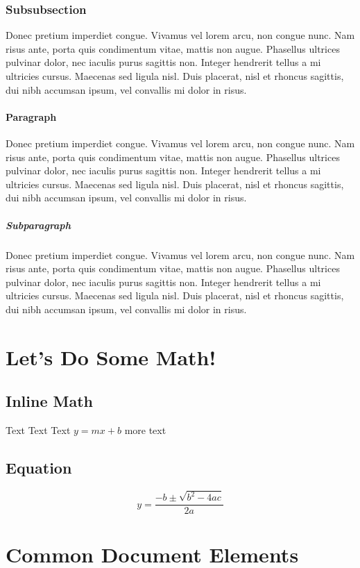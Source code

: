\documentclass{article}
\begin{document}
\subsubsection{Subsubsection}
Donec pretium imperdiet congue. Vivamus vel lorem arcu, non congue nunc. Nam
risus ante, porta quis condimentum vitae, mattis non augue. Phasellus ultrices
pulvinar dolor, nec iaculis purus sagittis non. Integer hendrerit tellus a mi
ultricies cursus. Maecenas sed ligula nisl. Duis placerat, nisl et rhoncus
sagittis, dui nibh accumsan ipsum, vel convallis mi dolor in risus.

\paragraph{Paragraph}
Donec pretium imperdiet congue. Vivamus vel lorem arcu, non congue nunc. Nam
risus ante, porta quis condimentum vitae, mattis non augue. Phasellus ultrices
pulvinar dolor, nec iaculis purus sagittis non. Integer hendrerit tellus a mi
ultricies cursus. Maecenas sed ligula nisl. Duis placerat, nisl et rhoncus
sagittis, dui nibh accumsan ipsum, vel convallis mi dolor in risus.

\subparagraph{Subparagraph}
Donec pretium imperdiet congue. Vivamus vel lorem arcu, non congue nunc. Nam
risus ante, porta quis condimentum vitae, mattis non augue. Phasellus ultrices
pulvinar dolor, nec iaculis purus sagittis non. Integer hendrerit tellus a mi
ultricies cursus. Maecenas sed ligula nisl. Duis placerat, nisl et rhoncus
sagittis, dui nibh accumsan ipsum, vel convallis mi dolor in risus.

\section{Let's Do Some Math!}

\subsection{Inline Math}
Text Text Text $y = mx + b$ more text

\subsection{Equation}

\begin{equation}
y = \frac{-b \pm \sqrt{b^{2} - 4ac}}{2a}
\end{equation}


\section{Common Document Elements}
\end{document}
